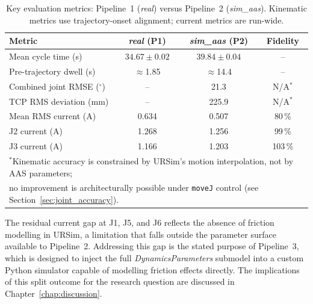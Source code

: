 \begin{table}[htbp]
\centering
\caption{Key evaluation metrics: Pipeline~1 (\textit{real}) versus Pipeline~2
         (\textit{sim\_aas}). Kinematic metrics use trajectory-onset alignment; current
         metrics are run-wide.}
\label{tab:summary}
\begin{tabular}{lccc}
\toprule
Metric                         & \textit{real} (P1) & \textit{sim\_aas} (P2) & Fidelity \\
\midrule
Mean cycle time (s)            & $34.67 \pm 0.02$   & $39.84 \pm 0.04$       & -- \\
Pre-trajectory dwell (s)       & $\approx$1.85      & $\approx$14.4          & -- \\
\midrule
Combined joint RMSE ($^\circ$) & --                 & 21.3                   & N/A$^{*}$ \\
TCP RMS deviation (mm)         & --                 & 225.9                  & N/A$^{*}$ \\
\midrule
Mean RMS current (A)           & 0.634              & 0.507                  & 80\,\% \\
J2 current (A)                 & 1.268              & 1.256                  & 99\,\% \\
J3 current (A)                 & 1.166              & 1.203                  & 103\,\% \\
\bottomrule
\multicolumn{4}{l}{\footnotesize $^{*}$Kinematic accuracy is constrained by URSim's motion
interpolation, not by AAS parameters;} \\
\multicolumn{4}{l}{\footnotesize \phantom{$^{*}$}no improvement is architecturally
possible under \texttt{moveJ} control (see Section~\ref{sec:joint_accuracy}).} \\
\end{tabular}
\end{table}

The residual current gap at J1, J5, and J6 reflects the absence of friction modelling in
URSim, a limitation that falls outside the parameter surface available to Pipeline~2.
Addressing this gap is the stated purpose of Pipeline~3, which is designed to inject the full
\textit{DynamicsParameters} submodel into a custom Python simulator capable of modelling
friction effects directly.
The implications of this split outcome for the research question are discussed in
Chapter~\ref{chap:discussion}.
